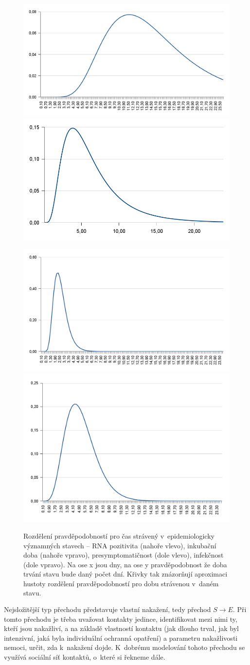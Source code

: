 \begin{figure}%
\centerline{%
\includegraphics[width=0.49\columnwidth]{pic/time-rna}%
\includegraphics[width=0.49\columnwidth]{pic/time-ink}}
\centerline{%
\includegraphics[width=0.49\columnwidth]{pic/time-pre}%
\includegraphics[width=0.49\columnwidth]{pic/time-inf}%
}
\caption{Rozdělení pravděpodobností pro čas strávený v~epidemiologicky významných stavech -- RNA pozitivita (nahoře vlevo), inkubační doba (nahoře vpravo), presymptomatičnost (dole vlevo), infekčnost (dole vpravo). Na ose x jsou dny, na ose y pravděpodobnost že doba trvání stavu bude daný počet dní. Křivky tak znázorňují aproximaci hustoty rozdělení pravděpodobností pro dobu strávenou v~daném stavu.}%
\label{fig:times-states}%
\end{figure}

Nejsložitější typ přechodu představuje vlastní nakažení, tedy přechod $S\to E$. Při tomto přechodu je třeba uvažovat kontakty jedince, identifikovat mezi nimi ty, kteří jsou nakažliví, a na základě vlastností kontaktu (jak dlouho trval, jak byl intenzivní, jaká byla individuální ochranná opatření) a parametru nakažlivosti nemoci, určit, zda k~nakažení dojde. K~dobrému modelování tohoto přechodu se využívá sociální síť kontaktů, o~které si řekneme dále. 

